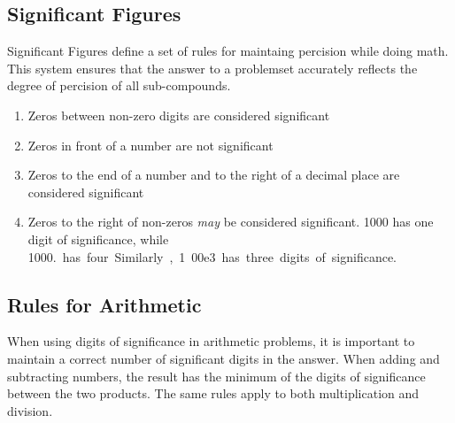 \subsection{Significant Figures}
Significant Figures define a set of rules for maintaing percision while doing
math.  This system ensures that the answer to a problemset accurately reflects
the degree of percision of all sub-compounds.

\begin{enumerate}
  \item Zeros between non-zero digits are considered significant
  \item Zeros in front of a number are not significant
  \item Zeros to the end of a number and to the right of a decimal place are
    considered significant
  \item Zeros to the right of non-zeros \textit{may} be considered significant.
    \si{1000} has one digit of significance, while \si{1000.} has four.
    Similarly, \si{1.00e3} has three digits of significance.
\end{enumerate}

\subsection{Rules for Arithmetic}
When using digits of significance in arithmetic problems, it is important to
maintain a correct number of significant digits in the answer.  When adding and
subtracting numbers, the result has the minimum of the digits of significance
between the two products.  The same rules apply to both multiplication and
division.
